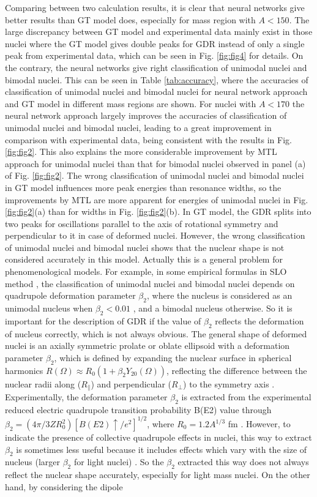\documentclass[twocolumn,showpacs,superscriptaddress,amsmath,amssymb,prc,preprintnumbers]{revtex4-1}
\begin{document}
Comparing between two calculation results, it is clear that neural networks give better results than GT model does, especially for mass region with $A<150$. The large discrepancy between GT model and experimental data mainly exist in those nuclei where the GT model gives double peaks for GDR instead of only a single peak from experimental data, which can be seen in Fig. \ref{fig:fig4} for details. On the contrary, the neural networks give right classification of unimodal nuclei and bimodal nuclei. This can be seen in Table \ref{tab:accuracy}, where the accuracies of classification of unimodal nuclei and bimodal nuclei for neural network approach and GT model in different mass regions are shown. For nuclei with $A<170$ the neural network approach largely improves the accuracies of classification of unimodal nuclei and bimodal nuclei, leading to a great improvement in comparison with experimental data, being consistent with the results in Fig. \ref{fig:fig2}. This also explains the more considerable improvement by MTL approach for unimodal nuclei than that for bimodal nuclei observed in panel (a) of Fig. \ref{fig:fig2}. The wrong classification of unimodal nuclei and bimodal nuclei in GT model influences more peak energies than resonance widths, so the improvements by MTL are more apparent for energies of unimodal nuclei in Fig. \ref{fig:fig2}(a) than for widths in Fig. \ref{fig:fig2}(b).   In GT model, the GDR splits into two peaks for oscillations parallel to the axis of rotational symmetry and perpendicular to it in case of deformed nuclei. However, the wrong classification of unimodal nuclei and bimodal nuclei shows that the nuclear shape is not considered accurately in this model. Actually this is a general problem for phenomenological models. For example, in some empirical formulas in SLO method \cite{Capote2009}, the classification of unimodal nuclei and bimodal nuclei depends on quadrupole deformation parameter $\beta_2$, where the nucleus is considered as an unimodal nucleus when $\beta_2 < 0.01$ \cite{RIPL3}, and a bimodal nucleus otherwise.  So it is important for the description of GDR  if  the value of $\beta_2$ reflects the deformation of nucleus correctly, which is not always obvious. The general shape of deformed nuclei is an axially symmetric prolate or oblate ellipsoid with a deformation parameter $\beta_2$, which is defined by expanding the nuclear surface in spherical harmonics $R(\Omega) \approx R_0 (1+\beta_2 Y_{20} (\Omega))$, reflecting the difference between the nuclear radii along ($R_{\rVert}$) and perpendicular ($R_{\perp}$) to the symmetry axis \cite{Bohr1998, Harakeh2001}. Experimentally, the deformation parameter $\beta_2$ is extracted from the experimental reduced electric quadrupole transition probability B(E2) value through $\beta_2=(4\pi/3ZR_0^2)[B(E2)\uparrow/e^2]^{1/2}$, where $R_0 = 1.2 A^{1/3}$ fm \cite{Raman20011}. However, to indicate the presence of collective quadrupole effects in nuclei, this way to extract $\beta_2$ is sometimes less useful because it includes effects which vary with the size of nucleus (larger $\beta_2$ for light nuclei) \cite{Raman20011}. So the $\beta_2$ extracted this way does not always reflect the nuclear shape accurately, especially for light mass nuclei. On the other hand, by considering the dipole 
\end{document}
